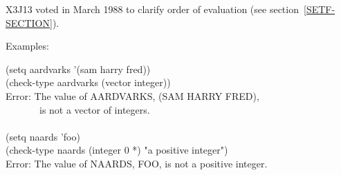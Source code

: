 \begin{defmac}
\begin{newer}
X3J13 voted in March 1988 
to clarify order of evaluation (see section~\ref{SETF-SECTION}).
\end{newer}

Examples:
\begin{lisp}
(setq aardvarks '(sam harry fred)) \\
(check-type aardvarks (vector integer)) \\
Error: The value of AARDVARKS, (SAM HARRY FRED), \\
~~~~~~~is not a vector of integers. \\
 \\
(setq naards 'foo) \\
(check-type naards (integer 0 *) "a positive integer") \\
Error: The value of NAARDS, FOO, is not a positive integer.
\end{lisp}

\end{defmac}


